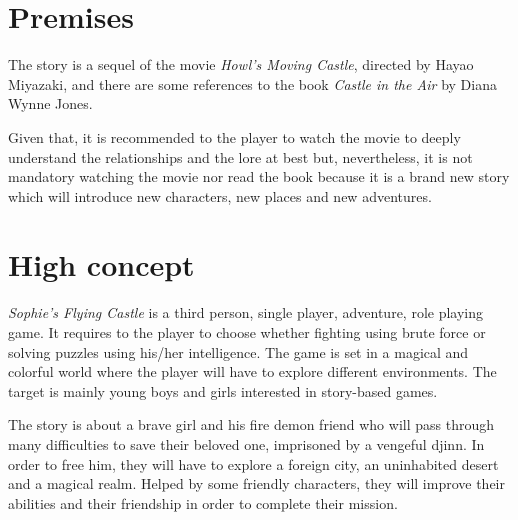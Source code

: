 \section{Premises}

The story is a sequel of the movie \textit{Howl’s Moving Castle}, directed by Hayao Miyazaki, and there are some references to the book \textit{Castle in the Air} by Diana Wynne Jones.

Given that, it is recommended to the player to watch the movie to deeply understand the relationships and the lore at best but, nevertheless, it is not mandatory watching the movie nor read the book because it is a brand new story which will introduce new characters, new places and new adventures.

\section{High concept}

\textit{Sophie's Flying Castle} is a third person, single player, adventure, role playing game. It requires to the player to choose whether fighting using brute force or solving puzzles using his/her intelligence. The game is set in a magical and colorful world where the player will have to explore different environments. 
The target is mainly young boys and girls interested in story-based games.

The story is about a brave girl and his fire demon friend who will pass through many difficulties to save their beloved one, imprisoned by a vengeful djinn. In order to free him, they will have to explore a foreign city, an uninhabited desert and a magical realm. Helped by some friendly characters, they will improve their abilities and their friendship in order to complete their mission.
